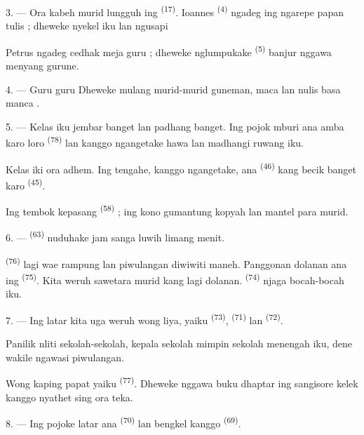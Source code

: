 3. --- Ora kabeh murid lungguh ing 
\textsuperscript{(17)}. Ioannes \textsuperscript{(4)} ngadeg ing
ngarepe papan tulis ; dheweke nyekel  iku lan
ngusapi 

Petrus ngadeg cedhak meja guru ; dheweke nglumpukake  \textsuperscript{(5)} banjur nggawa menyang gurune.

4. --- Guru  guru  Dheweke mulang
murid-murid guneman, maca lan nulis basa manca .

5. --- Kelas iku jembar banget lan padhang banget. Ing pojok mburi ana
 amba karo  loro \textsuperscript{(78)}
lan  kanggo ngangetake hawa lan madhangi ruwang
iku.

Kelas iki ora adhem. Ing tengahe, kanggo ngangetake, ana
 \textsuperscript{(46)} kang becik banget karo
 \textsuperscript{(45)}.

Ing tembok kepasang  \textsuperscript{(58)} ;
ing kono gumantung kopyah lan mantel para murid.

\VUsaut{5.2mm}
\VUsaut{3.6mm}

6. ---  \textsuperscript{(63)} nuduhake jam sanga
luwih limang menit.

 \textsuperscript{(76)} lagi wae rampung lan
piwulangan diwiwiti maneh. Panggonan dolanan ana ing 
\textsuperscript{(75)}. Kita weruh sawetara murid kang lagi dolanan.
 \textsuperscript{(74)} njaga bocah-bocah iku.

7. --- Ing latar kita uga weruh wong liya, yaiku  \textsuperscript{(73)}, 
\textsuperscript{(71)} lan 
\textsuperscript{(72)}.

Panilik nliti sekolah-sekolah, kepala sekolah mimpin sekolah menengah
iku, dene wakile ngawasi piwulangan.

Wong kaping papat yaiku 
\textsuperscript{(77)}. Dheweke nggawa buku dhaptar ing sangisore
kelek kanggo nyathet sing ora teka.

8. --- Ing pojoke latar ana 
\textsuperscript{(70)} lan bengkel kanggo 
\textsuperscript{(69)}.


